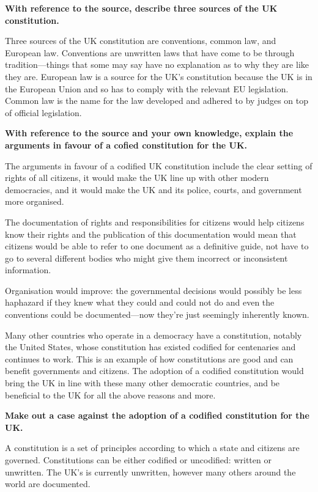 \documentclass[11pt,a4paper]{article}
\begin{document}
\textbf{With reference to the source, describe three sources of the UK constitution.}

Three sources of the UK constitution are conventions, common law, and European law.  Conventions are unwritten laws that have come to be through tradition---things that some may say have no explanation as to why they are like they are.  European law is a source for the UK's constitution because the UK is in the European Union and so has to comply with the relevant EU legislation.  Common law is the name for the law developed and adhered to by judges on top of official legislation.

\textbf{With reference to the source and your own knowledge, explain the arguments in favour of a cofied constitution for the UK.}

The arguments in favour of a codified UK constitution include the clear setting of rights of all citizens, it would make the UK line up with other modern democracies, and it would make the UK and its police, courts, and government more organised.

The documentation of rights and responsibilities for citizens would help citizens know their rights and the publication of this documentation would mean that citizens would be able to refer to one document as a definitive guide, not have to go to several different bodies who might give them incorrect or inconsistent information.

Organisation would improve: the governmental decisions would possibly be less haphazard if they knew what they could and could not do and even the conventions could be documented---now they're just seemingly inherently known.

Many other countries who operate in a democracy have a constitution, notably the United States, whose constitution has existed codified for centenaries and continues to work.  This is an example of how constitutions are good and can benefit governments and citizens.  The adoption of a codified constitution would bring the UK in line with these many other democratic countries, and be beneficial to the UK for all the above reasons and more.

\textbf{Make out a case against the adoption of a codified constitution for the UK.}

A constitution is a set of principles according to which a state and citizens are governed.  Constitutions can be either codified or uncodified: written or unwritten.  The UK's is currently unwritten, however many others around the world are documented.
\end{document}

